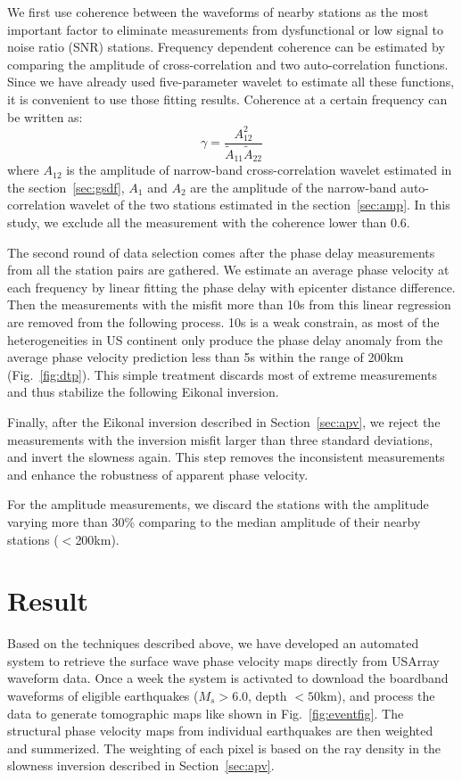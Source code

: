 \documentclass[referee]{gji}
\begin{document}
We first use coherence between the waveforms of nearby stations as the most important factor to eliminate measurements from dysfunctional or low signal to noise ratio (SNR) stations. Frequency dependent coherence can be estimated by comparing the amplitude of cross-correlation and two auto-correlation functions. Since we have already used five-parameter wavelet to estimate all these functions, it is convenient to use those fitting results. Coherence at a certain frequency can be written as:
\[
\gamma = \frac{A_{12}^2}{\tilde{A}_{11}\tilde{A}_{22}}
\]
where $A_{12}$ is the amplitude of narrow-band cross-correlation wavelet estimated in the section~\ref{sec:gsdf}, $A_{1}$  and $A_{2}$ are the amplitude of the narrow-band auto-correlation wavelet of the two stations estimated in the section~\ref{sec:amp}. In this study, we exclude all the measurement with the coherence lower than 0.6.

The second round of data selection comes after the phase delay measurements from all the station pairs are gathered. We estimate an average phase velocity at each frequency by linear fitting the phase delay with epicenter distance difference. Then the measurements with the misfit more than 10s from this linear regression are removed from the following process. 10s is a weak constrain, as most of the heterogeneities in US continent only produce the phase delay anomaly from the average phase velocity prediction less than 5s within the range of 200km (Fig.~\ref{fig:dtp}). This simple treatment discards most of extreme measurements and thus stabilize the following Eikonal inversion.

Finally, after the Eikonal inversion described in Section~\ref{sec:apv}, we reject the measurements with the inversion misfit larger than three standard deviations, and invert the slowness again. This step removes the inconsistent measurements and enhance the robustness of apparent phase velocity. 

For the amplitude measurements, we discard the stations with the amplitude varying more than 30\% comparing to the median amplitude of their nearby stations ($<$200km).   


\section{Result}

Based on the techniques described above, we have developed an automated system to retrieve the surface wave phase velocity maps directly from USArray waveform data. Once a week the system is activated to download the boardband waveforms of eligible earthquakes ($M_s > 6.0$, depth $<50$km), and process the data to generate tomographic maps like shown in Fig.~\ref{fig:eventfig}. The structural phase velocity maps from individual earthquakes are then weighted and summerized. The weighting of each pixel is based on the ray density in the slowness inversion described in Section~\ref{sec:apv}.
\end{document}
